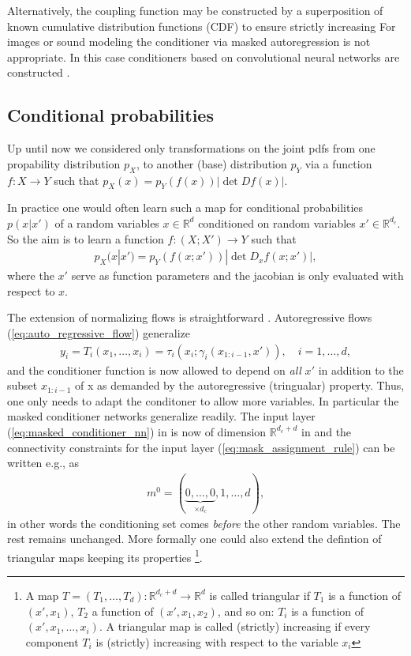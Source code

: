 \documentclass[12pt,a4paper]{article}
\begin{document}
Alternatively, the coupling function may be constructed by a superposition of known cumulative distribution functions (CDF) to ensure strictly increasing  For images or sound modeling the conditioner via masked autoregression is not appropriate. In this case conditioners based on convolutional neural networks are constructed \cite{ho_2019_flow_pp, oord_2016_pixel_cnn, oord_2016_wavenet, oord_2017_parallel_wavenet}. 


\subsection{Conditional probabilities}
Up until now we considered only transformations on the joint pdfs from one propability distribution $p_X$, to another (base) distribution $p_Y$ via a function $f: X\rightarrow Y$ such that $p_X(x) = p_Y(f(x)) |\det Df(x)|$. 


In practice one would often learn such a map for conditional probabilities $p(x|x')$ of a random variables $x\in\mathbb{R}^d$ conditioned on random variables $x' \in \mathbb{R}^{d_c}$. So the aim is to learn a function $f: (X;X') \rightarrow Y$ such that
\begin{align}
p_X(x|x') = p_Y(f(x;x')) |\det D_xf(x;x')| \label{eq:pdf_trafo_inv}, 
\end{align}
where the $x'$ serve as function parameters and the jacobian is only evaluated with respect to $x$.


The extension of normalizing flows is straightforward  
\cite{papamakarios_2017_maf}. Autoregressive flows (\ref{eq:auto_regressive_flow}) generalize
\begin{align} 
y_i =T_i(x_1,\dots, x_i) = \tau_i(x_i; \gamma_i(x_{1:i-1}, x')), \quad i=1,\dots,d, 
\end{align} 
and the conditioner function is now allowed to depend on \textit{all} $x'$ in addition to the subset $x_{1:i-1}$ of x as demanded by the autoregressive (tringualar) property. Thus, one only needs to adapt the conditoner to allow more variables. In particular the masked conditioner networks generalize readily. The input layer (\ref{eq:masked_conditioner_nn}) in is now of dimension $\mathbb{R}^{d_c + d}$ in 
and the connectivity constraints for the input layer (\ref{eq:mask_assignment_rule}) can be written e.g., as 
\begin{align}
	m^0  = (\underbrace{0, \dots, 0}_{\times d_c}, 1, \dots, d),
\end{align}
in other words the conditioning set comes \textit{before} the other random variables. The rest remains unchanged. More formally one could also extend the defintion of triangular maps keeping its properties \footnote{A map $T=(T_1, \dots, T_d): \mathbb{R}^{d_c + d}  \rightarrow \mathbb{R}^d $ is called triangular if $T_1$ is a function of $(x', x_1)$, $T_2$ a function of $(x', x_1, x_2)$, and so on: $T_i$ is a function of $(x', x_1,\dots, x_i)$. A triangular map is called (strictly) increasing if every component $T_i$ is (strictly) increasing with respect to the variable $x_i$}.
\end{document}
